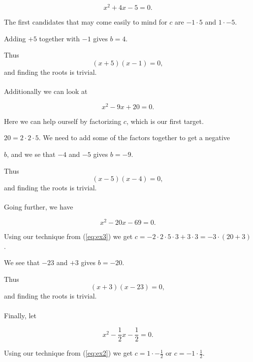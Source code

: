 \documentclass[a4paper]{article}
\begin{document}
\begin{equation}  \label{eq:ex2}
	x^2 + 4x - 5  = 0.
\end{equation}

The first candidates that may come easily to mind for $c$ are $-1\cdot5$ and $1\cdot-5$.

Adding $+5$ together with $-1$ gives $b=4$.

Thus
\begin{equation} \label{eq:ex21}
 (x+5)(x-1) = 0,
\end{equation}
and finding the roots is trivial.\\ \\
Additionally we can look at

\begin{equation}  \label{eq:ex3}
	x^2 - 9x + 20 = 0.
\end{equation}

Here we can help ourself by factorizing $c$, which is our first target. 

$20=2\cdot2\cdot5$. We need to add some of the factors together to get a negative 

$b$, and we se that $-4$ and $-5$ gives $b=-9$.

Thus
\begin{equation} \label{eq:ex31}
 (x-5)(x-4) = 0,
\end{equation}
and finding the roots is trivial.\\ \\
Going further, we have

\begin{equation}  \label{eq:ex4}
	x^2 - 20x - 69 = 0.
\end{equation}

Using our technique from (\ref{eq:ex3}) we get $c=-2\cdot2\cdot5\cdot3+3\cdot3 = -3\cdot(20+3)$.

We see that $-23$ and $+3$ gives $b=-20$.

Thus
\begin{equation} \label{eq:ex41}
 (x+3)(x-23) = 0,
\end{equation}
and finding the roots is trivial.\\ \\
Finally, let

\begin{equation}  \label{eq:ex5}
	x^2 - \frac{1}{2}x - \frac{1}{2} = 0.
\end{equation}

Using our technique from (\ref{eq:ex2}) we get $c=1\cdot- \frac{1}{2}$ or $c=-1\cdot\frac{1}{2}$.
\end{document}
